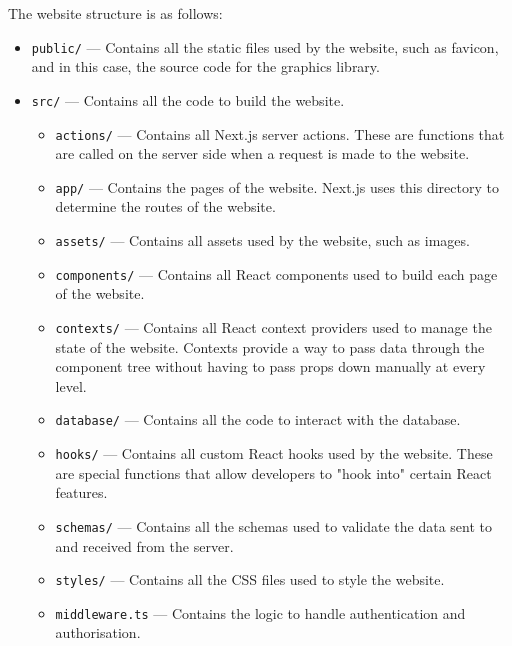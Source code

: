 \documentclass[../main.tex]{subfiles}
\begin{document}
            The website structure is as follows:
            \begin{itemize}
                \item \texttt{public/} — Contains all the static files used by the website, such as
                      favicon, and in this case, the source code for the graphics library.
                \item \texttt{src/} — Contains all the code to build the website.
                      \begin{itemize}
                          \item \texttt{actions/} — Contains all Next.js server actions.
                                These are functions that are called on the server side when a request is made
                                    to the website.
                          \item \texttt{app/} — Contains the pages of the website.
                                Next.js uses this directory to determine the routes of the website.
                          \item \texttt{assets/} — Contains all assets used by the website, such as images.
                          \item \texttt{components/} — Contains all React components used to build each page of
                                the website.
                          \item \texttt{contexts/} — Contains all React context providers used to manage the state
                                of the website.
                                Contexts provide a way to pass data through the component tree without having
                                    to pass props down manually at every level.
                          \item \texttt{database/} — Contains all the code to interact with the database.
                          \item \texttt{hooks/} — Contains all custom React hooks used by the website.
                                These are special functions that allow developers to "hook into" certain React
                                    features.
                          \item \texttt{schemas/} — Contains all the schemas used to validate the data sent to and
                                received from the server.
                          \item \texttt{styles/} — Contains all the CSS files used to style the website.
                          \item \texttt{middleware.ts} — Contains the logic to handle authentication and
                                authorisation.
                      \end{itemize}
            \end{itemize}
\end{document}
